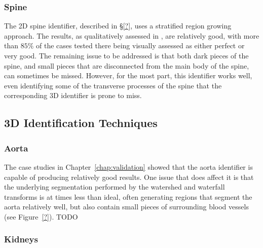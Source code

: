 \subsubsection{Spine}

The 2D spine identifier, described in \S\ref{?}, uses a stratified region growing approach. The results, as qualitatively assessed in \cite{gvc09}, are relatively good, with more than $85\%$ of the cases tested there being visually assessed as either perfect or very good. The remaining issue to be addressed is that both dark pieces of the spine, and small pieces that are disconnected from the main body of the spine, can sometimes be missed. However, for the most part, this identifier works well, even identifying some of the transverse processes of the spine that the corresponding 3D identifier is prone to miss.

\subsection{3D Identification Techniques}

\subsubsection{Aorta}

The case studies in Chapter~\ref{chap:validation} showed that the aorta identifier is capable of producing relatively good results. One issue that does affect it is that the underlying segmentation performed by the watershed and waterfall transforms is at times less than ideal, often generating regions that segment the aorta relatively well, but also contain small pieces of surrounding blood vessels (see Figure~\ref{?}). TODO

\subsubsection{Kidneys}

